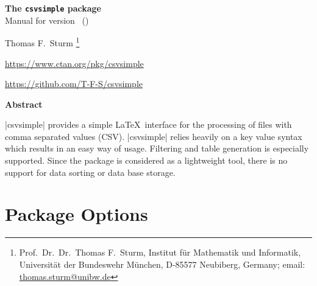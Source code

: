 \documentclass[a4paper,11pt]{ltxdoc}
\begin{document}
\begin{center}
\begin{tcolorbox}[enhanced,hbox,tikznode,left=8mm,right=8mm,boxrule=0.4pt,
  colback=white,colframe=black!50!yellow,
  drop lifted shadow=black!50!yellow,arc is angular,
  before=\par\vspace*{5mm},after=\par\bigskip]
{\bfseries\LARGE The \texttt{csvsimple} package}\\[3mm]
{\large Manual for version \version\ (\datum)}
\end{tcolorbox}
{\large Thomas F.~Sturm%
  \footnote{Prof.~Dr.~Dr.~Thomas F.~Sturm, Institut f\"{u}r Mathematik und Informatik,
    Universit\"{a}t der Bundeswehr M\"{u}nchen, D-85577 Neubiberg, Germany;
     email: \href{mailto:thomas.sturm@unibw.de}{thomas.sturm@unibw.de}}\par\medskip
\normalsize\url{https://www.ctan.org/pkg/csvsimple}\par
\url{https://github.com/T-F-S/csvsimple}
}
\end{center}
\bigskip
\begin{absquote}
  \begin{center}\bfseries Abstract\end{center}
  |csvsimple| provides a simple \LaTeX\ interface for the processing of files with
  comma separated values (CSV). |csvsimple| relies heavily on a key value
  syntax which results in an easy way of usage.
  Filtering and table generation is especially supported. Since the package
  is considered as a lightweight tool, there is no support for data sorting
  or data base storage.
\end{absquote}

\section{Package Options}%
\end{document}
